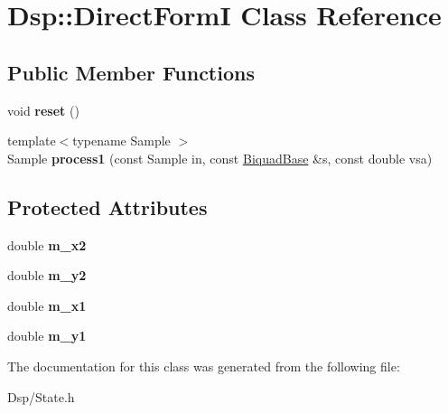 \hypertarget{classDsp_1_1DirectFormI}{\section{Dsp\-:\-:Direct\-Form\-I Class Reference}
\label{classDsp_1_1DirectFormI}
}
\subsection*{Public Member Functions}
\begin{DoxyCompactItemize}
\item 
\hypertarget{classDsp_1_1DirectFormI_a1a2bd66e0d7f9f465e3e186405ea3d68}{void {\bfseries reset} ()}\label{classDsp_1_1DirectFormI_a1a2bd66e0d7f9f465e3e186405ea3d68}

\item 
\hypertarget{classDsp_1_1DirectFormI_a6e62e0c0346412b9bd57ca182dfae511}{{\footnotesize template$<$typename Sample $>$ }\\Sample {\bfseries process1} (const Sample in, const \hyperlink{classDsp_1_1BiquadBase}{Biquad\-Base} \&s, const double vsa)}\label{classDsp_1_1DirectFormI_a6e62e0c0346412b9bd57ca182dfae511}

\end{DoxyCompactItemize}
\subsection*{Protected Attributes}
\begin{DoxyCompactItemize}
\item 
\hypertarget{classDsp_1_1DirectFormI_ae9c62a9259d2f7511bd7e78f182a3cd1}{double {\bfseries m\-\_\-x2}}\label{classDsp_1_1DirectFormI_ae9c62a9259d2f7511bd7e78f182a3cd1}

\item 
\hypertarget{classDsp_1_1DirectFormI_abb7b8d4564eab676e356c077ae5b8d48}{double {\bfseries m\-\_\-y2}}\label{classDsp_1_1DirectFormI_abb7b8d4564eab676e356c077ae5b8d48}

\item 
\hypertarget{classDsp_1_1DirectFormI_aa59a29b59528a9b38e858804ae49e005}{double {\bfseries m\-\_\-x1}}\label{classDsp_1_1DirectFormI_aa59a29b59528a9b38e858804ae49e005}

\item 
\hypertarget{classDsp_1_1DirectFormI_a4e53d119f57e3010e94b14457d90c6f8}{double {\bfseries m\-\_\-y1}}\label{classDsp_1_1DirectFormI_a4e53d119f57e3010e94b14457d90c6f8}

\end{DoxyCompactItemize}


The documentation for this class was generated from the following file\-:\begin{DoxyCompactItemize}
\item 
Dsp/State.\-h\end{DoxyCompactItemize}
